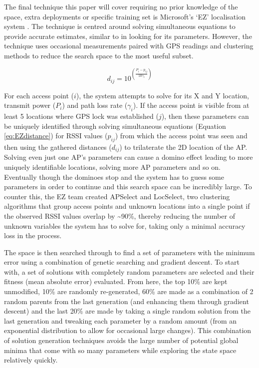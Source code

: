 \documentclass{UoYCSproject}
\begin{document}
                The final technique this paper will cover requiring no prior knowledge of the space, extra deployments or specific training set is Microsoft's `EZ' localisation system \citep{chintalapudi2010indoor}. The technique is centred around solving simultaneous equations to provide accurate estimates, similar to \citet{madigan2005bayesian} in looking for its parameters. However, the technique uses occasional measurements paired with GPS readings and clustering methods to reduce the search space to the most useful subset. 
                
                \begin{equation} \label{eq:EZdistance}
                    d_{ij} = 10^{\left(\frac{P_i - p_{ij}}{10\gamma_i}\right)}
                \end{equation}
                
                For each access point ($i$), the system attempts to solve for its X and Y location, transmit power ($P_i$) and path loss rate ($\gamma_i$). If the access point is visible from at least 5 locations where GPS lock was established ($j$), then these parameters can be uniquely identified through solving simultaneous equations (Equation \ref{eq:EZdistance}) for RSSI values ($p_{ij}$) from which the access point was seen and then using the gathered distances ($d_{ij}$) to trilaterate the 2D location of the AP. Solving even just one AP's parameters can cause a domino effect leading to more uniquely identifiable locations, solving more AP parameters and so on. Eventually though the dominoes stop and the system has to guess some parameters in order to continue and this search space can be incredibly large. To counter this, the EZ team created APSelect and LocSelect, two clustering algorithms that group access points and unknown locations into a single point if the observed RSSI values overlap by \textasciitilde90\%, thereby reducing the number of unknown variables the system has to solve for, taking only a minimal accuracy loss in the process.
                
                The space is then searched through to find a set of parameters with the minimum error using a combination of genetic searching and gradient descent. To start with, a set of solutions with completely random parameters are selected and their fitness (mean absolute error) evaluated. From here, the top 10\% are kept unmodified, 10\% are randomly re-generated, 60\% are made as a combination of 2 random parents from the last generation (and enhancing them through gradient descent) and the last 20\% are made by taking a single random solution from the last generation and tweaking each parameter by a random amount (from an exponential distribution to allow for occasional large changes). This combination of solution generation techniques avoids the large number of potential global minima that come with so many parameters while exploring the state space relatively quickly.
                
\end{document}
